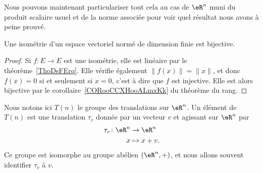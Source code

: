 Nous pouvons maintenant particulariser tout cela au cas de \( \eR^n\) muni du produit scalaire usuel et de la norme associée pour voir quel résultat nous avons à peine prouvé.

\begin{lemma}        \label{LEMooJPYZooHETCqt}
    Une isométrie d'un espace vectoriel normé de dimension finie est bijective.
\end{lemma}

\begin{proof}
    Si \( f\colon E\to E\) est une isométrie, elle est linéaire par le théorème~\ref{ThoDsFErq}. Elle vérifie également \( \| f(x) \|=\| x \|\), et donc \( f(x)=0\) si et seulement si \( x=0\), c'est à dire que \( f\) est injective. Elle est alors bijective par le corollaire~\ref{CORooCCXHooALmxKk} du théorème du rang.
\end{proof}

Nous notons ici \( T(n)\) le groupe des translations sur \( \eR^n\). Un élément de \( T(n)\) est une translation \( \tau_v\) donnée par un vecteur \( v\) et agissant sur \( \eR^n\) par
\begin{equation}
    \begin{aligned}
        \tau_v\colon \eR^n&\to \eR^{n} \\
        x&\mapsto x+v.
    \end{aligned}
\end{equation}
Ce groupe est isomorphe au groupe abélien \( (\eR^n,+)\), et nous allons souvent identifier \( \tau_v\) à \( v\).

